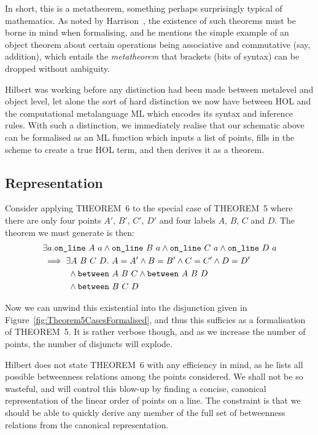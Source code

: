 In short, this is a metatheorem, something perhaps surprisingly typical of mathematics. As noted by Harrison~\cite{FormalizedMathematics}, the existence of such theorems must be borne in mind when formalising, and he mentions the simple example of an object theorem about certain operations being associative and commutative (say, addition), which entails the \emph{metatheorem} that brackets (bits of syntax) can be dropped without ambiguity.

Hilbert was working before any distinction had been made between metalevel and object level, let alone the sort of hard distinction we now have between HOL and the computational metalanguage ML which encodes its syntax and inference rules. With such a distinction, we immediately realise that our schematic above can be formalised as an ML function which inputs a list of points, fills in the scheme to create a true HOL term, and then derives it as a theorem.

\subsection{Representation}
Consider applying THEOREM~6 to the special case of THEOREM~5 where there are only four points $A'$, $B'$, $C'$, $D'$ and four labels $A$, $B$, $C$ and $D$. The theorem we must generate is then:
\begin{equation*}
  \begin{split}
    &\exists a. \code{on\_line}\ A\ a\wedge\code{on\_line}\ B\ a\wedge\code{on\_line}\ C\ a\wedge\code{on\_line}\ D\ a\\
    &\implies\exists A\ B\ C\ D.\ A = A' \wedge B = B' \wedge C = C' \wedge D = D'\\
    &\qquad\quad\wedge\between{A}{B}{C} \wedge \between{A}{B}{D}\\
    &\qquad\quad\wedge\between{B}{C}{D}
  \end{split}
\end{equation*} 

Now we can unwind this existential into the disjunction given in Figure~\ref{fig:Theorem5CasesFormalised}, and thus this sufficies as a formalisation of THEOREM~5. It is rather verbose though, and as we increase the number of points, the number of disjuncts will explode. 

Hilbert does not state THEOREM~6 with any efficiency in mind, as he lists all possible betweenness relations among the points considered. We shall not be so wasteful, and will control this blow-up by finding a concise, canonical representation of the linear order of points on a line. The constraint is that we should be able to quickly derive any member of the full set of betweenness relations from the canonical representation.

